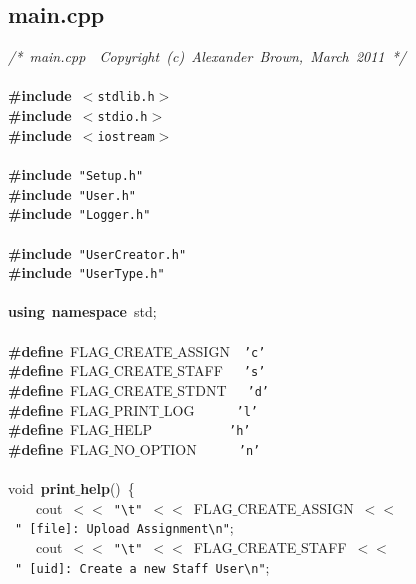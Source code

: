 \clearpage
\normalsize
\rmfamily
\subsection{main.cpp}
\scriptsize
\sffamily
\noindent
\mbox{}\textit{/*\ main.cpp\ \ Copyright\ (c)\ Alexander\ Brown,\ March\ 2011\ */} \\
\mbox{} \\
\mbox{}\textbf{\#include}\ \texttt{$<$stdlib.h$>$} \\
\mbox{}\textbf{\#include}\ \texttt{$<$stdio.h$>$} \\
\mbox{}\textbf{\#include}\ \texttt{$<$iostream$>$} \\
\mbox{} \\
\mbox{}\textbf{\#include}\ \texttt{"{}Setup.h"{}} \\
\mbox{}\textbf{\#include}\ \texttt{"{}User.h"{}} \\
\mbox{}\textbf{\#include}\ \texttt{"{}Logger.h"{}} \\
\mbox{} \\
\mbox{}\textbf{\#include}\ \texttt{"{}UserCreator.h"{}} \\
\mbox{}\textbf{\#include}\ \texttt{"{}UserType.h"{}} \\
\mbox{} \\
\mbox{}\textbf{using}\ \textbf{namespace}\ std; \\
\mbox{} \\
\mbox{}\textbf{\#define}\ FLAG$\_$CREATE$\_$ASSIGN\ \ \texttt{'c'} \\
\mbox{}\textbf{\#define}\ FLAG$\_$CREATE$\_$STAFF\ \ \ \texttt{'s'} \\
\mbox{}\textbf{\#define}\ FLAG$\_$CREATE$\_$STDNT\ \ \ \texttt{'d'} \\
\mbox{}\textbf{\#define}\ FLAG$\_$PRINT$\_$LOG\ \ \ \ \ \ \texttt{'l'} \\
\mbox{}\textbf{\#define}\ FLAG$\_$HELP\ \ \ \ \ \ \ \ \ \ \ \texttt{'h'} \\
\mbox{}\textbf{\#define}\ FLAG$\_$NO$\_$OPTION\ \ \ \ \ \ \texttt{'n'} \\
\mbox{} \\
\mbox{}void\ \textbf{print$\_$help}()\ \{ \\
\mbox{}\ \ \ \ cout\ $<$$<$\ \texttt{"{}}\texttt{\textbackslash{}t}\texttt{"{}}\ $<$$<$\ FLAG$\_$CREATE$\_$ASSIGN\ $<$$<$\ \texttt{"{}\ [file]:\ Upload\ Assignment}\texttt{\textbackslash{}n}\texttt{"{}}; \\
\mbox{}\ \ \ \ cout\ $<$$<$\ \texttt{"{}}\texttt{\textbackslash{}t}\texttt{"{}}\ $<$$<$\ FLAG$\_$CREATE$\_$STAFF\ $<$$<$\ \texttt{"{}\ [uid]:\ Create\ a\ new\ Staff\ User}\texttt{\textbackslash{}n}\texttt{"{}}; \\
